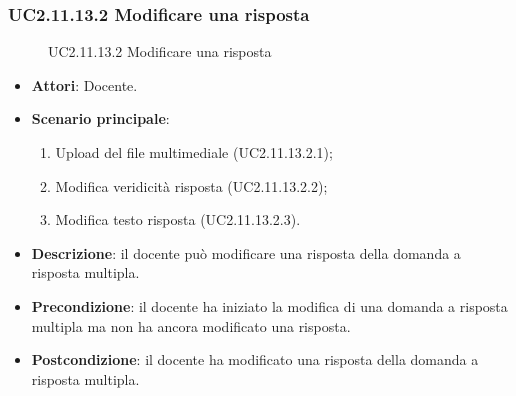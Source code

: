\subsubsection{UC2.11.13.2 Modificare una risposta}
\begin{figure}[H]
\centering
\noindent{}
\caption{UC2.11.13.2 Modificare una risposta}
\end{figure}
\begin{itemize}
\item \textbf{Attori}: Docente.
\item \textbf{Scenario principale}:
\begin{enumerate}
\item Upload del file multimediale (UC2.11.13.2.1);
\item Modifica veridicità risposta (UC2.11.13.2.2);
\item Modifica testo risposta (UC2.11.13.2.3).
\end{enumerate}
\item \textbf{Descrizione}: il docente può modificare una risposta della domanda a risposta multipla.
\item \textbf{Precondizione}: il docente ha iniziato la modifica di una domanda a risposta multipla ma non ha ancora modificato una risposta.
\item \textbf{Postcondizione}: il docente ha modificato una risposta della domanda a risposta multipla.
\end{itemize}
